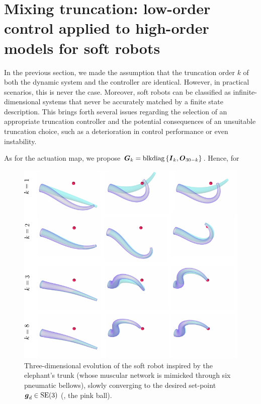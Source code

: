 \section{Mixing truncation: low-order control applied to high-order models for soft robots}
In the previous section, we made the assumption that the truncation order $k$ of both the dynamic system and the controller are identical. However, in practical scenarios, this is never the case. Moreover, soft robots can be classified as infinite-dimensional systems that never be accurately matched by a finite state description. This brings forth several issues regarding the selection of an appropriate truncation controller and the potential consequences of an unsuitable truncation choice, such as a deterioration in control performance or even instability.

As for the actuation map, we propose $\boldsymbol{G}_k = \textnormal{blkdiag}\left\{ {\boldsymbol{I}_{k}, \boldsymbol{O}_{30-k}} \right\}$. Hence, for 


\begin{figure}[!t]
    \centering
    \vspace{-3mm}
    \includegraphics*[width=\textwidth]{./pdf/thesis-figure-5-13.pdf}
    \vspace{-9mm}
    \caption{Three-dimensional evolution of the soft robot inspired by the elephant's trunk (whose muscular network is mimicked through six pneumatic bellows), slowly converging to the desired set-point $\boldsymbol{g}_d \in \textup{\textrm{SE}}(3)$ (\ie, the pink ball). }
    \label{fig:C3:multilink_3D}
  \end{figure}

